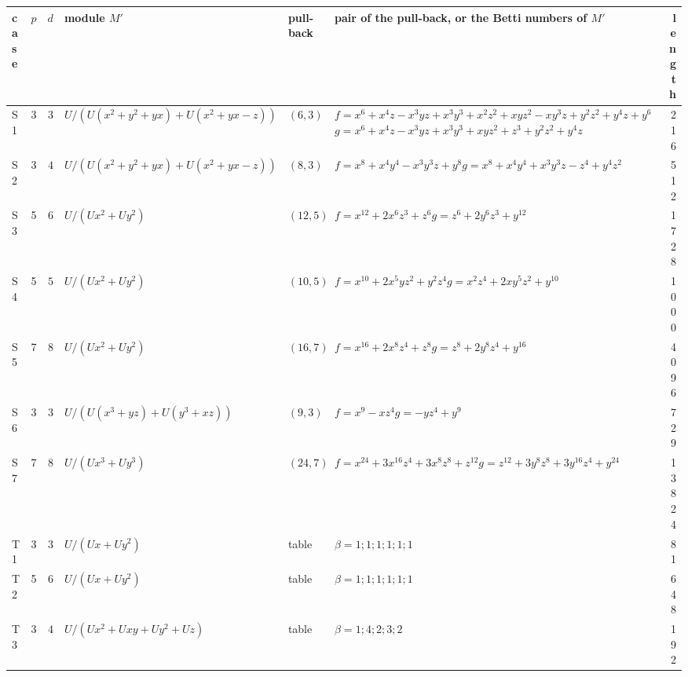 \begin{tabular}{@{}lrr>{\raggedright\arraybackslash}p{3.4cm}l>{\raggedright\arraybackslash}p{5.0cm}r@{}}
\toprule
case & $p$ & $d$ & module $M'$ & pull-back & pair of the pull-back, or the Betti numbers of $M'$ & length\\
\midrule
S1 & 3 & $3$ & $U/(U(x^{2}+y^{2}+yx)+U(x^{2}+yx-z))$ & $(6,3)$ & $f=x^{6} + x^{4}z - x^{3}yz + x^{3}y^{3} + x^{2}z^{2} + xyz^{2} - xy^{3}z + y^{2}z^{2} + y^{4}z + y^{6}$\newline $g=x^{6} + x^{4}z - x^{3}yz + x^{3}y^{3} + xyz^{2} + z^{3} + y^{2}z^{2} + y^{4}z$ & 216\\
S2 & 3 & $4$ & $U/(U(x^{2}+y^{2}+yx)+U(x^{2}+yx-z))$ & $(8,3)$ & $f=x^{8} + x^{4}y^{4} - x^{3}y^{3}z + y^{8}$\newline $g=x^{8} + x^{4}y^{4} + x^{3}y^{3}z - z^{4} + y^{4}z^{2}$ & 512\\
S3 & 5 & $6$ & $U/(Ux^{2}+Uy^{2})$ & $(12,5)$ & $f=x^{12} + 2x^{6}z^{3} + z^{6}$\newline $g=z^{6} + 2y^{6}z^{3} + y^{12}$ & 1728\\
S4 & 5 & $5$ & $U/(Ux^{2}+Uy^{2})$ & $(10,5)$ & $f=x^{10} + 2x^{5}yz^{2} + y^{2}z^{4}$\newline $g=x^{2}z^{4} + 2xy^{5}z^{2} + y^{10}$ & 1000\\
S5 & 7 & $8$ & $U/(Ux^{2}+Uy^{2})$ & $(16,7)$ & $f=x^{16} + 2x^{8}z^{4} + z^{8}$\newline $g=z^{8} + 2y^{8}z^{4} + y^{16}$ & 4096\\
S6 & 3 & $3$ & $U/(U(x^{3}+yz)+U(y^{3}+xz))$ & $(9,3)$ & $f=x^{9} - xz^{4}$\newline $g=-yz^{4} + y^{9}$ & 729\\
S7 & 7 & $8$ & $U/(Ux^{3}+Uy^{3})$ & $(24,7)$ & $f=x^{24} + 3x^{16}z^{4} + 3x^{8}z^{8} + z^{12}$\newline $g=z^{12} + 3y^{8}z^{8} + 3y^{16}z^{4} + y^{24}$ & 13824\\
T1 & 3 & $3$ & $U/(Ux+Uy^{2})$ & table & $\beta=1;1;1;1;1;1$ & 81\\
T2 & 5 & $6$ & $U/(Ux+Uy^{2})$ & table & $\beta=1;1;1;1;1;1$ & 648\\
T3 & 3 & $4$ & $U/(Ux^{2}+Uxy+Uy^{2}+Uz)$ & table & $\beta=1;4;2;3;2$ & 192\\
\bottomrule
\end{tabular}
